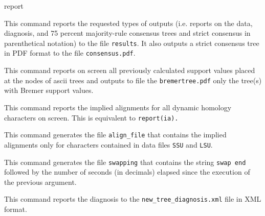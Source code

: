 \begin{command}{report}{}
\begin{poyexamples}
         {This command reports the requested types of outputs (i.e.
        reports on the data, diagnosis, and 75 percent majority-rule consensus 
        trees and strict consensus in parenthetical notation) to the file
         \texttt{results}. It also outputs a strict consensus tree in PDF format
         to the file \texttt{consensus.pdf}.}
         
         {This command reports on screen all previously calculated support values
         placed at the nodes of ascii trees and outputs to file the \texttt{bremertree.pdf}
         only the tree(s) with Bremer support values.}
         
         {This command reports the implied alignments for all dynamic homology
         characters on screen.  This is equivalent to \texttt{report(ia).}}
         
          {This command generates the file \texttt{align\_file} that contains
          the implied alignments only for characters contained in data files
          \texttt{SSU} and \texttt{LSU}.}
                  
          {This command generates the file \texttt{swapping} that contains
          the string \texttt{swap end} followed by the number of seconds (in
          decimals) elapsed since the execution of the previous 
          argument.}
          
         {This command reports the diagnosis to the \texttt{new\_tree\_diagnosis.xml}
         file in XML format.}

	\end{poyexamples}

	\begin{poyalso}
	 \end{poyalso}

\end{command}

   
